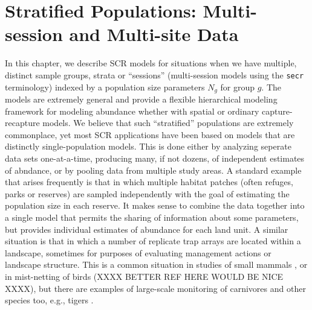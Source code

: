\chapter{Stratified Populations: 
Multi-session and Multi-site Data}
\label{chapt.hscr}

\vspace{0.3cm}


In this chapter, we describe SCR models for situations when we have
multiple, distinct sample groups, strata or ``sessions'' (multi-session
models using the \mbox{\tt secr} terminology) indexed by a
 population size parameters $N_{g}$ for group $g$. The models are
extremely general and provide a flexible hierarchical modeling
framework for modeling abundance \citep{converse_royle:2012,
  royle_etal:2012arXiv} whether with spatial or ordinary
capture-recapture models.  We believe that such ``stratified''
populations are extremely commonplace, yet most SCR applications have
been based on models that are distinctly single-population
models. This is done either by analyzing seperate data sets
one-at-a-time, producing many, if not dozens, of independent estimates
of abndance, or by pooling data from multiple study areas.  A standard
example that arises frequently is that in which multiple habitat 
patches (often refuges, parks or reserves) are sampled independently
with the goal of estimating the population size in each reserve. It
makes sense to combine the data together into a single model that
permits the sharing of information about some parameters, but provides
individual estimates of abundance for each land unit.  A similar
situation is that in which a number of replicate trap arrays are
located within a landscape, sometimes for purposes of evaluating
management actions or landscape structure. This is a common situation
in studies of small mammals \citep{converse_etal:2006jwm,
  converse_etal:2006ea, converse_royle:2012}, or in mist-netting of
birds \citep{desante_etal:1995} (XXXX BETTER REF HERE WOULD BE NICE
XXXX), but there are examples of large-scale monitoring of carnivores
and other species too, e.g., tigers \citep{jhala_etal:2011}.

